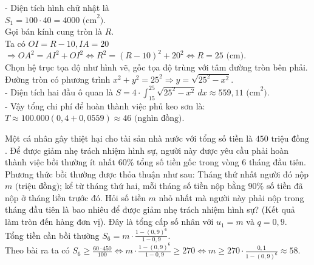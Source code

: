 \begin{ex}
{\begin{center}
\begin{tikzpicture}[>=stealth, scale=0.06]
			\end{tikzpicture}
		\end{center}
		- Diện tích hình chữ nhật là\\
		$S_1 = 100 \cdot 40 = 4000\text{ (cm}^2\text{)}$.\\
		Gọi bán kính cung tròn là $R$.\\
		Ta có $OI = R - 10, IA = 20$\\
		$\Rightarrow OA^2 = AI^2 + OI^2 \Leftrightarrow R^2 = (R - 10)^2 + 20^2 \Leftrightarrow R = 25\text{ (cm)}$.\\
		Chọn hệ trục tọa độ như hình vẽ, gốc tọa độ trùng với tâm đường tròn bên phải. Đường tròn có phương trình $x^2 + y^2 = 25^2 \Rightarrow y = \sqrt{25^2 - x^2}$.\\
		- Diện tích hai đầu ô quan là $\displaystyle S = 4 \cdot \int_{15}^{25} \sqrt{25^2 - x^2} \,dx \approx 559,11\text{ (cm}^2\text{)}$.\\
		- Vậy tổng chi phí để hoàn thành việc phủ keo sơn là:\\
		$\displaystyle T \approx 100.000(0,4+0,0559) \approx 46\text{ (nghìn đồng)}$.
	}
\end{ex}

\begin{ex} %
	Một cá nhân gây thiệt hại cho tài sản nhà nước với tổng số tiền là $450\text{ triệu đồng}$. Để được giảm nhẹ trách nhiệm hình sự, người này được yêu cầu phải hoàn thành việc bồi thường ít nhất $60\%$ tổng số tiền gốc trong vòng $6$ tháng đầu tiên. Phương thức bồi thường được thỏa thuận như sau: Tháng thứ nhất người đó nộp $m\text{ (triệu đồng)}$; kể từ tháng thứ hai, mỗi tháng số tiền nộp bằng $90\%$ số tiền đã nộp ở tháng liền trước đó. Hỏi số tiền $m$ nhỏ nhất mà người này phải nộp trong tháng đầu tiên là bao nhiêu để được giảm nhẹ trách nhiệm hình sự? (Kết quả làm tròn đến hàng đơn vị).
	\loigiai
	{
		Đây là tổng cấp số nhân với $u_1 = m$ và $q = 0{,}9$.\\
		Tổng tiền cần bồi thường $\displaystyle S_6 = m \cdot \frac{1 - (0{,}9)^6}{1 - 0{,}9}$.\\
		Theo bài ra ta có $\displaystyle S_6 \ge \frac{60 \cdot 450}{100} \Leftrightarrow m \cdot \frac{1 - (0{,}9)^6}{1 - 0{,}9} \ge 270 \Leftrightarrow m \ge 270 \cdot \frac{0{,}1}{1 - (0{,}9)^6} \approx 58$.
	}
\end{ex}


